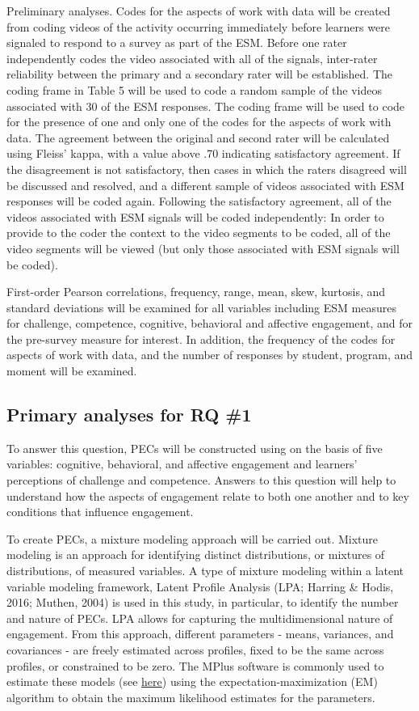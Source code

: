 \documentclass[]{msu-thesis}
\theoremstyle{definition}
\theoremstyle{definition}
\theoremstyle{definition}
\theoremstyle{remark}
\begin{document}
Preliminary analyses. Codes for the aspects of work with data will be
created from coding videos of the activity occurring immediately before
learners were signaled to respond to a survey as part of the ESM. Before
one rater independently codes the video associated with all of the
signals, inter-rater reliability between the primary and a secondary
rater will be established. The coding frame in Table 5 will be used to
code a random sample of the videos associated with 30 of the ESM
responses. The coding frame will be used to code for the presence of one
and only one of the codes for the aspects of work with data. The
agreement between the original and second rater will be calculated using
Fleiss' kappa, with a value above .70 indicating satisfactory agreement.
If the disagreement is not satisfactory, then cases in which the raters
disagreed will be discussed and resolved, and a different sample of
videos associated with ESM responses will be coded again. Following the
satisfactory agreement, all of the videos associated with ESM signals
will be coded independently: In order to provide to the coder the
context to the video segments to be coded, all of the video segments
will be viewed (but only those associated with ESM signals will be
coded).

First-order Pearson correlations, frequency, range, mean, skew,
kurtosis, and standard deviations will be examined for all variables
including ESM measures for challenge, competence, cognitive, behavioral
and affective engagement, and for the pre-survey measure for interest.
In addition, the frequency of the codes for aspects of work with data,
and the number of responses by student, program, and moment will be
examined.

\subsection{Primary analyses for RQ
\#1}\label{primary-analyses-for-rq-1}

To answer this question, PECs will be constructed using on the basis of
five variables: cognitive, behavioral, and affective engagement and
learners' perceptions of challenge and competence. Answers to this
question will help to understand how the aspects of engagement relate to
both one another and to key conditions that influence engagement.

To create PECs, a mixture modeling approach will be carried out. Mixture
modeling is an approach for identifying distinct distributions, or
mixtures of distributions, of measured variables. A type of mixture
modeling within a latent variable modeling framework, Latent Profile
Analysis (LPA; Harring \& Hodis, 2016; Muthen, 2004) is used in this
study, in particular, to identify the number and nature of PECs. LPA
allows for capturing the multidimensional nature of engagement. From
this approach, different parameters - means, variances, and covariances
- are freely estimated across profiles, fixed to be the same across
profiles, or constrained to be zero. The MPlus software is commonly used
to estimate these models (see
\href{https://www.statmodel.com/examples/mixture.shtml}{here}) using the
expectation-maximization (EM) algorithm to obtain the maximum likelihood
estimates for the parameters.
\end{document}
